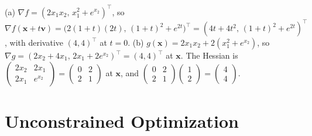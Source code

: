 \documentclass[11pt]{article}
\begin{document}
\begin{description}[leftmargin=0pt, itemsep=0.3em]
    \item[\ref{pr:hvp}.] (a) $\nabla f = (2x_1x_2, \, x_1^2 + e^{x_2})^\top$, so $\nabla f(\mathbf{x} + t\mathbf{v}) = \big(2(1 + t)(2t), \, (1 + t)^2 + e^{2t}\big)^\top = (4t + 4t^2, \, (1 + t)^2 + e^{2t})^\top$, with derivative $(4, 4)^\top$ at $t = 0$. (b) $g(\mathbf{x}) = 2x_1x_2 + 2(x_1^2 + e^{x_2})$, so $\nabla g = (2x_2 + 4x_1, \, 2x_1 + 2e^{x_2})^\top = (4, 4)^\top$ at $\mathbf{x}$. The Hessian is $\begin{pmatrix} 2x_2 & 2x_1 \\ 2x_1 & e^{x_2} \end{pmatrix} = \begin{pmatrix} 0 & 2 \\ 2 & 1 \end{pmatrix}$ at $\mathbf{x}$, and $\begin{pmatrix} 0 & 2 \\ 2 & 1 \end{pmatrix}\begin{pmatrix} 1 \\ 2 \end{pmatrix} = \begin{pmatrix} 4 \\ 4 \end{pmatrix}$.
\end{description}

\section*{Unconstrained Optimization}
\end{document}
